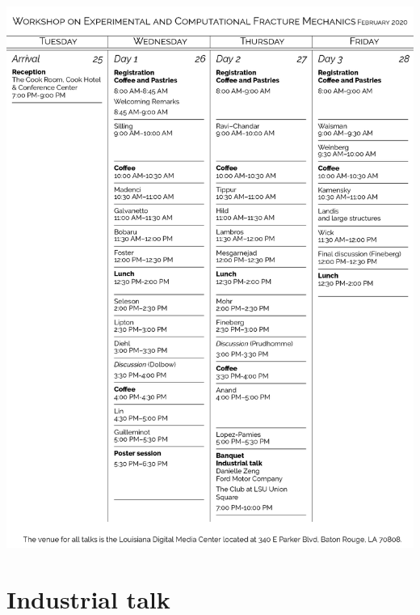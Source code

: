 \documentclass[12pt,letterpaper]{book}
\begin{document}
%

\newpage

\includegraphics[width=\linewidth]{timetable_edit.png}


\tableofcontents

\mainmatter

\chapter{Industrial talk}
\end{document}
